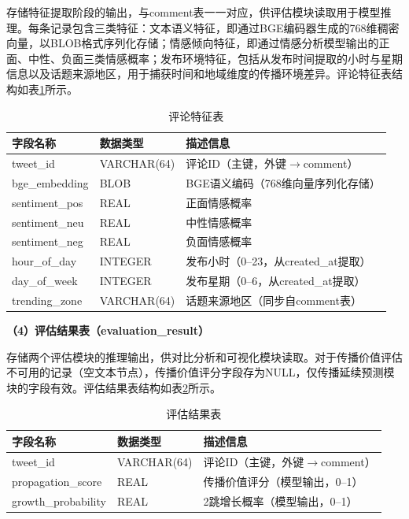 存储特征提取阶段的输出，与comment表一一对应，供评估模块读取用于模型推理。每条记录包含三类特征：文本语义特征，即通过BGE编码器生成的768维稠密向量，以BLOB格式序列化存储；情感倾向特征，即通过情感分析模型输出的正面、中性、负面三类情感概率；发布环境特征，包括从发布时间提取的小时与星期信息以及话题来源地区，用于捕获时间和地域维度的传播环境差异。评论特征表结构如表\ref{tab:comment_feature}所示。

\begin{table}[H]
  \centering
  \caption{评论特征表}
  \label{tab:comment_feature}
  \renewcommand\arraystretch{1.35}
  \begin{tabular}{>{\centering\arraybackslash}m{3cm} >{\centering\arraybackslash}m{2.5cm} >{\centering\arraybackslash}m{8cm}}
    \toprule
    字段名称 & 数据类型 & 描述信息 \\
    \midrule
    tweet\_id & VARCHAR(64) & 评论ID（主键，外键$\to$comment） \\
    bge\_embedding & BLOB & BGE语义编码（768维向量序列化存储） \\
    sentiment\_pos & REAL & 正面情感概率 \\
    sentiment\_neu & REAL & 中性情感概率 \\
    sentiment\_neg & REAL & 负面情感概率 \\
    hour\_of\_day & INTEGER & 发布小时（0--23，从created\_at提取） \\
    day\_of\_week & INTEGER & 发布星期（0--6，从created\_at提取） \\
    trending\_zone & VARCHAR(64) & 话题来源地区（同步自comment表） \\
    \bottomrule
  \end{tabular}
\end{table}

\textbf{（4）评估结果表（evaluation\_result）}

存储两个评估模块的推理输出，供对比分析和可视化模块读取。对于传播价值评估不可用的记录（空文本节点），传播价值评分字段存为NULL，仅传播延续预测模块的字段有效。评估结果表结构如表\ref{tab:eval_result}所示。

\begin{table}[H]
  \centering
  \caption{评估结果表}
  \label{tab:eval_result}
  \renewcommand\arraystretch{1.35}
  \begin{tabular}{>{\centering\arraybackslash}m{3.5cm} >{\centering\arraybackslash}m{2.5cm} >{\centering\arraybackslash}m{7.5cm}}
    \toprule
    字段名称 & 数据类型 & 描述信息 \\
    \midrule
    tweet\_id & VARCHAR(64) & 评论ID（主键，外键$\to$comment） \\
    propagation\_score & REAL & 传播价值评分（模型输出，0--1） \\
    growth\_probability & REAL & 2跳增长概率（模型输出，0--1） \\
    \bottomrule
  \end{tabular}
\end{table}

